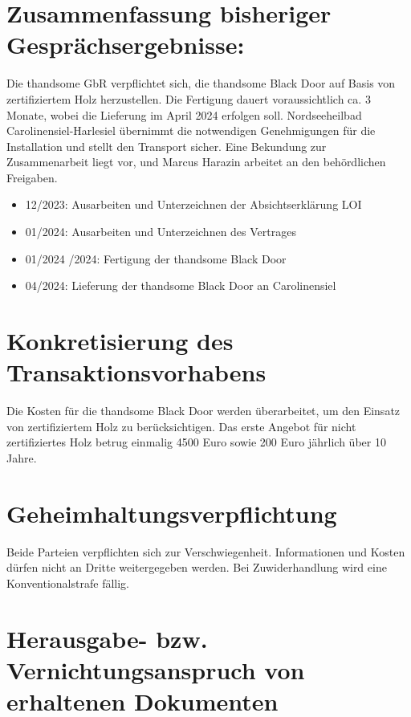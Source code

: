 \section[short]{Zusammenfassung bisheriger Gesprächsergebnisse: }

Die thandsome GbR verpflichtet sich, die thandsome Black Door auf Basis von zertifiziertem Holz herzustellen. 
Die Fertigung dauert voraussichtlich ca. 3 Monate, wobei die Lieferung im April 2024 erfolgen soll. 
Nordseeheilbad Carolinensiel-Harlesiel übernimmt die notwendigen Genehmigungen für die Installation und stellt 
den Transport sicher. Eine Bekundung zur Zusammenarbeit liegt vor, und Marcus Harazin 
arbeitet an den behördlichen Freigaben. 


\begin{itemize}
    \item 12/2023: Ausarbeiten und Unterzeichnen der Absichtserklärung \- LOI
    \item 01/2024: Ausarbeiten und Unterzeichnen des Vertrages 
    \item 01/2024 /2024: Fertigung der thandsome Black Door 
    \item 04/2024: Lieferung der thandsome Black Door an Carolinensiel 
    \end{itemize}
    


\section[short]{Konkretisierung des Transaktionsvorhabens}

Die Kosten für die thandsome Black Door werden überarbeitet, um den Einsatz von zertifiziertem
Holz zu berücksichtigen. Das erste Angebot für nicht zertifiziertes Holz betrug einmalig
4500 Euro sowie 200 Euro jährlich über 10 Jahre. 


\section[short]{Geheimhaltungsverpflichtung}

Beide Parteien verpflichten sich zur Verschwiegenheit. 
Informationen und Kosten dürfen nicht an Dritte weitergegeben werden.
Bei Zuwiderhandlung wird eine Konventionalstrafe fällig. 

  
\section[short]{Herausgabe- bzw. Vernichtungsanspruch von erhaltenen Dokumenten}

